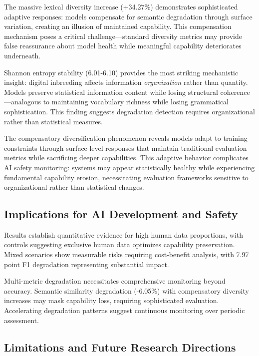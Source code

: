 \documentclass{article}
\begin{document}
The massive lexical diversity increase (+34.27\%) demonstrates sophisticated adaptive responses: models compensate for semantic degradation through surface variation, creating an illusion of maintained capability. This compensation mechanism poses a critical challenge—standard diversity metrics may provide false reassurance about model health while meaningful capability deteriorates underneath.

Shannon entropy stability (6.01-6.10) provides the most striking mechanistic insight: digital inbreeding affects information \emph{organization} rather than quantity. Models preserve statistical information content while losing structural coherence—analogous to maintaining vocabulary richness while losing grammatical sophistication. This finding suggests degradation detection requires organizational rather than statistical measures.

The compensatory diversification phenomenon reveals models adapt to training constraints through surface-level responses that maintain traditional evaluation metrics while sacrificing deeper capabilities. This adaptive behavior complicates AI safety monitoring: systems may appear statistically healthy while experiencing fundamental capability erosion, necessitating evaluation frameworks sensitive to organizational rather than statistical changes.

\subsection{Implications for AI Development and Safety}

Results establish quantitative evidence for high human data proportions, with controls suggesting exclusive human data optimizes capability preservation. Mixed scenarios show measurable risks requiring cost-benefit analysis, with 7.97 point F1 degradation representing substantial impact.

Multi-metric degradation necessitates comprehensive monitoring beyond accuracy. Semantic similarity degradation (-6.05\%) with compensatory diversity increases may mask capability loss, requiring sophisticated evaluation. Accelerating degradation patterns suggest continuous monitoring over periodic assessment.

\subsection{Limitations and Future Research Directions}
\end{document}
